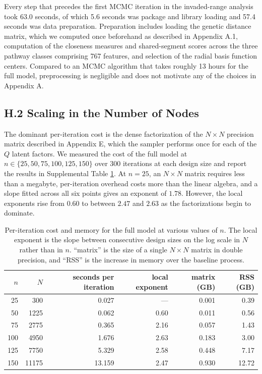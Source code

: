 \documentclass{article}
\begin{document}
Every step that precedes the first MCMC iteration in the invaded-range analysis
took 63.0 seconds, of which 5.6 seconds was package and library loading and 57.4
seconds was data preparation. Preparation includes loading the genetic distance matrix, which we computed once beforehand as described in Appendix A.1, computation of the closeness
measures and shared-segment scores across the three pathway classes comprising
767 features, and selection of the radial basis function centers. Compared to an MCMC algorithm that takes roughly 13 hours for the full model, preprocessing is
negligible and does not motivate any of the choices in Appendix A.
 
\subsection*{H.2 Scaling in the Number of Nodes}
 
The dominant per-iteration cost is the dense factorization of the $N\times N$
precision matrix described in Appendix E, which the sampler performs once for
each of the $Q$ latent factors. We measured the cost of the full model at
$n\in\{25,50,75,100,125,150\}$ over 300 iterations at each design size and report the results in Supplemental Table \ref{tab:h1}.
At $n=25$, an $N\times N$ matrix requires less
than a megabyte, per-iteration overhead costs more than the linear algebra, and a slope fitted across all six points gives an exponent of
$1.78$. However, the local exponents rise from $0.60$ to between $2.47$ and $2.63$ as the factorizations
begin to dominate.
 
\begin{table}[h]
\caption{Per-iteration cost and memory for the full model at various values of $n$. The local exponent is the slope between consecutive design sizes on the log scale in $N$ rather than in $n$. ``matrix'' is the size of a single $N\times N$ matrix in double precision, and ``RSS'' is the increase in memory over the baseline process.}
\label{tab:h1}
\centering\small
\begin{tabular}{rrrrrr}
\toprule
$n$ & $N$ & seconds per iteration & local exponent & matrix (GB) & RSS (GB) \\
\midrule
 25 &   300 & \phantom{0}0.027 & --- & 0.001 & \phantom{0}0.39 \\
 50 &  1225 & \phantom{0}0.062 & 0.60 & 0.011 & \phantom{0}0.56 \\
 75 &  2775 & \phantom{0}0.365 & 2.16 & 0.057 & \phantom{0}1.43 \\
100 &  4950 & \phantom{0}1.676 & 2.63 & 0.183 & \phantom{0}3.00 \\
125 &  7750 & \phantom{0}5.329 & 2.58 & 0.448 & \phantom{0}7.17 \\
150 & 11175 & 13.159 & 2.47 & 0.930 & 12.72 \\
\bottomrule
\end{tabular}
\end{table}
 
\end{document}
